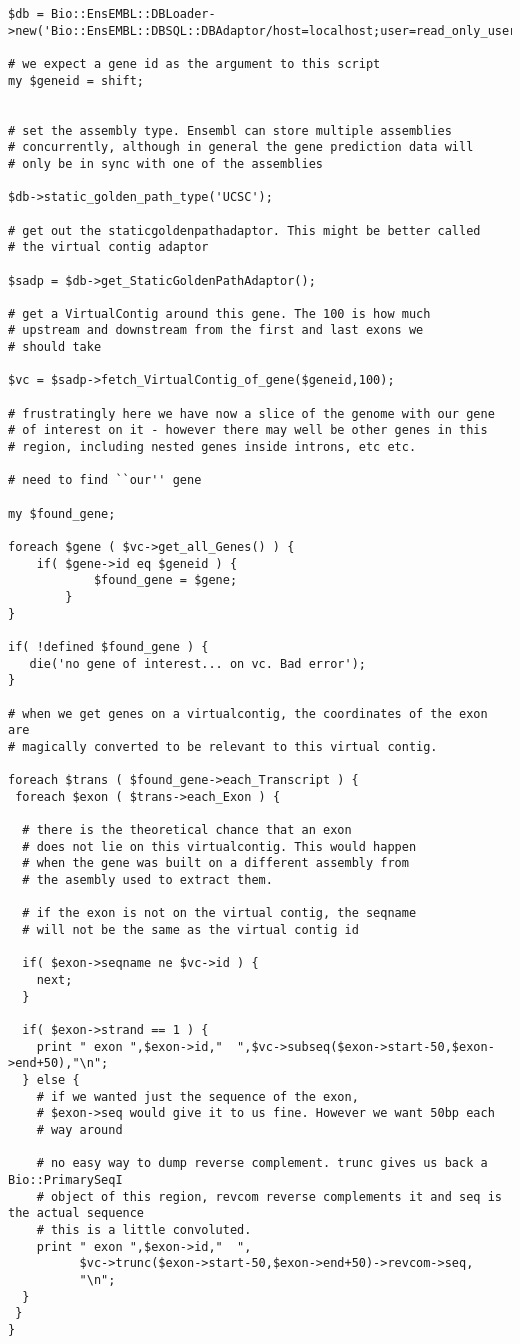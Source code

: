 \documentclass[11pt,a4paper]{article}
\begin{document}
\begin{verbatim}
$db = Bio::EnsEMBL::DBLoader->new('Bio::EnsEMBL::DBSQL::DBAdaptor/host=localhost;user=read_only_user;dbname=test_ensembl');

# we expect a gene id as the argument to this script
my $geneid = shift;


# set the assembly type. Ensembl can store multiple assemblies
# concurrently, although in general the gene prediction data will
# only be in sync with one of the assemblies

$db->static_golden_path_type('UCSC');

# get out the staticgoldenpathadaptor. This might be better called
# the virtual contig adaptor

$sadp = $db->get_StaticGoldenPathAdaptor();

# get a VirtualContig around this gene. The 100 is how much
# upstream and downstream from the first and last exons we
# should take

$vc = $sadp->fetch_VirtualContig_of_gene($geneid,100);

# frustratingly here we have now a slice of the genome with our gene
# of interest on it - however there may well be other genes in this
# region, including nested genes inside introns, etc etc.

# need to find ``our'' gene

my $found_gene;

foreach $gene ( $vc->get_all_Genes() ) {
	if( $gene->id eq $geneid ) {
            $found_gene = $gene;
        }
}

if( !defined $found_gene ) {
   die('no gene of interest... on vc. Bad error');
}

# when we get genes on a virtualcontig, the coordinates of the exon are
# magically converted to be relevant to this virtual contig.

foreach $trans ( $found_gene->each_Transcript ) {
 foreach $exon ( $trans->each_Exon ) {

  # there is the theoretical chance that an exon
  # does not lie on this virtualcontig. This would happen
  # when the gene was built on a different assembly from
  # the asembly used to extract them.

  # if the exon is not on the virtual contig, the seqname
  # will not be the same as the virtual contig id

  if( $exon->seqname ne $vc->id ) {
    next;
  }

  if( $exon->strand == 1 ) {
    print " exon ",$exon->id,"  ",$vc->subseq($exon->start-50,$exon->end+50),"\n";
  } else {
    # if we wanted just the sequence of the exon, 
    # $exon->seq would give it to us fine. However we want 50bp each
    # way around

    # no easy way to dump reverse complement. trunc gives us back a Bio::PrimarySeqI
    # object of this region, revcom reverse complements it and seq is the actual sequence
    # this is a little convoluted. 
    print " exon ",$exon->id,"  ",
          $vc->trunc($exon->start-50,$exon->end+50)->revcom->seq,
          "\n";
  }
 }
}

\end{verbatim}
\end{document}
